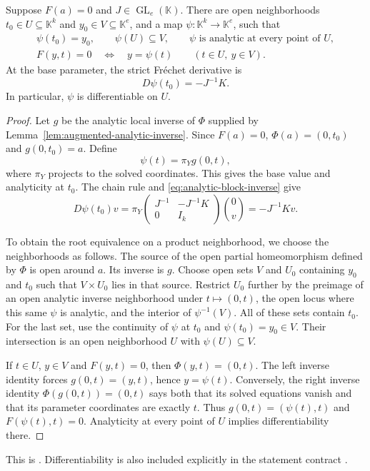 \begin{theorem}
\label{thm:analytic-local-graph}
Suppose $F(a)=0$ and $J\in\operatorname{GL}_e(\mathbb K)$. There are open
neighborhoods $t_0\in U\subseteq\mathbb K^k$ and
$y_0\in V\subseteq\mathbb K^e$, and a map
$\psi:\mathbb K^k\to\mathbb K^e$, such that
\begin{gather}
 \psi(t_0)=y_0,\qquad \psi(U)\subseteq V,\qquad
 \psi\text{ is analytic at every point of }U,\label{eq:analytic-psi}\\
 F(y,t)=0\quad\Longleftrightarrow\quad y=\psi(t)
 \qquad(t\in U,\ y\in V).\label{eq:analytic-root-graph}
\end{gather}
At the base parameter, the strict Fr\'echet derivative is
\begin{equation}
 \boxed{D\psi(t_0)=-J^{-1}K.}
 \label{eq:implicit-derivative}
\end{equation}
In particular, $\psi$ is differentiable on $U$.
\end{theorem}
\begin{proof}
Let $g$ be the analytic local inverse of $\Phi$ supplied by
Lemma~\ref{lem:augmented-analytic-inverse}. Since $F(a)=0$,
$\Phi(a)=(0,t_0)$ and $g(0,t_0)=a$. Define
\[
 \psi(t)=\pi_Yg(0,t),
\]
where $\pi_Y$ projects to the solved coordinates. This gives the base value
and analyticity at $t_0$. The chain rule and
\eqref{eq:analytic-block-inverse} give
\[
 D\psi(t_0)v
 =\pi_Y\begin{pmatrix}J^{-1}&-J^{-1}K\\0&I_k\end{pmatrix}
       \binom{0}{v}
 =-J^{-1}Kv.
\]

To obtain the root equivalence on a product neighborhood, we choose the
neighborhoods as follows. The source of the open partial homeomorphism defined by
$\Phi$ is open around $a$. Its inverse is $g$. Choose open sets $V$ and $U_0$
containing $y_0$ and $t_0$ such that
$V\times U_0$ lies in that source. Restrict $U_0$ further by the preimage of
an open analytic inverse neighborhood under $t\mapsto(0,t)$, the open locus
where this same $\psi$ is analytic, and the interior of $\psi^{-1}(V)$.
All of these sets contain $t_0$. For the last set, use the continuity of
$\psi$ at $t_0$ and $\psi(t_0)=y_0\in V$. Their intersection is an open
neighborhood $U$ with $\psi(U)\subseteq V$.

If $t\in U$, $y\in V$ and $F(y,t)=0$, then
$\Phi(y,t)=(0,t)$. The left inverse identity forces
$g(0,t)=(y,t)$, hence $y=\psi(t)$. Conversely, the right inverse identity
$\Phi(g(0,t))=(0,t)$ says both that its solved equations vanish and that its
parameter coordinates are exactly $t$. Thus
$g(0,t)=(\psi(t),t)$ and $F(\psi(t),t)=0$.
Analyticity at every point of $U$ implies differentiability there.
\end{proof}
This is
.
Differentiability is also included explicitly in the statement contract
.

